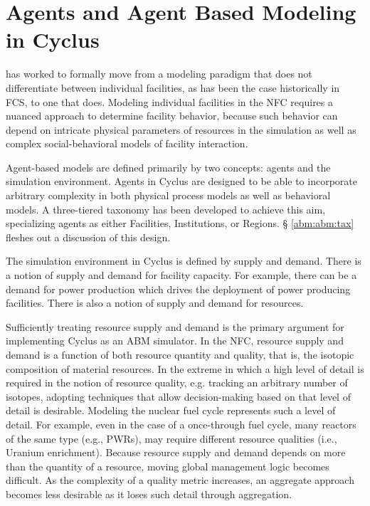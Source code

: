
\section{Agents and Agent Based Modeling in Cyclus}\label{abm:abm}

\Cyclus has worked to formally move from a modeling paradigm that does not
differentiate between individual facilities, as has been the case historically
in FCS, to one that does. Modeling individual facilities in the NFC requires a
nuanced approach to determine facility behavior, because such behavior can
depend on intricate physical parameters of resources in the simulation as well
as complex social-behavioral models of facility interaction.

Agent-based models are defined primarily by two concepts: agents and the
simulation environment. Agents in Cyclus are designed to be able to incorporate
arbitrary complexity in both physical process models as well as behavioral
models. A three-tiered taxonomy has been developed to achieve this aim,
specializing agents as either Facilities, Institutions, or Regions. \S
\ref{abm:abm:tax} fleshes out a discussion of this design.

The simulation environment in Cyclus is defined by supply and demand. There is a
notion of supply and demand for facility capacity. For example, there can be a
demand for power production which drives the deployment of power producing
facilities. There is also a notion of supply and demand for resources. 

Sufficiently treating resource supply and demand is the primary argument for
implementing Cyclus as an ABM simulator. In the NFC, resource supply and demand
is a function of both resource quantity and quality, that is, the isotopic
composition of material resources. In the extreme in which a high level of
detail is required in the notion of resource quality, e.g. tracking an arbitrary
number of isotopes, adopting techniques that allow decision-making based on that
level of detail is desirable. Modeling the nuclear fuel cycle represents such a
level of detail. For example, even in the case of a once-through fuel cycle,
many reactors of the same type (e.g., PWRs), may require different resource
qualities (i.e., Uranium enrichment). Because resource supply and demand depends
on more than the quantity of a resource, moving global management logic becomes
difficult. As the complexity of a quality metric increases, an aggregate
approach becomes less desirable as it loses such detail through aggregation.

